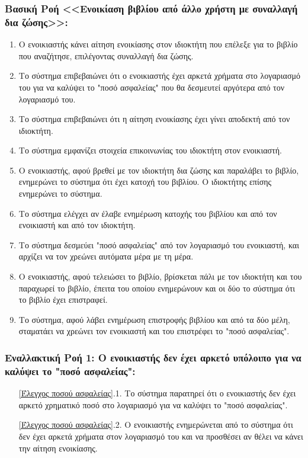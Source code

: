\documentclass[12pt,a4paper]{article}
\begin{document}
\subsubsection*{Βασική Ροή <<Ενοικίαση βιβλίου από άλλο χρήστη με συναλλαγή δια ζώσης>>:}
\begin{enumerate}
    \item Ο ενοικιαστής κάνει αίτηση ενοικίασης στον ιδιοκτήτη που επέλεξε για το βιβλίο που αναζήτησε, επιλέγοντας συναλλαγή δια ζώσης.
        \label{Επιλογή τρόπου συναλλαγής}
    \item Το σύστημα επιβεβαιώνει ότι ο ενοικιαστής έχει αρκετά χρήματα στο λογαριασμό του για να καλύψει το "ποσό ασφαλείας" που θα δεσμευτεί αργότερα από τον λογαριασμό του.
        \label{Έλεγχος ποσού ασφαλείας}
    \item Το σύστημα επιβεβαιώνει ότι η αίτηση ενοικίασης έχει γίνει αποδεκτή από τον ιδιοκτήτη.
        \label{Αποδοχή ή απόρριψη συναλλαγής}
    \item Το σύστημα εμφανίζει στοιχεία επικοινωνίας του ιδιοκτήτη στον ενοικιαστή.
    \item Ο ενοικιαστής, αφού βρεθεί με τον ιδιοκτήτη δια ζώσης και παραλάβει το βιβλίο, ενημερώνει το σύστημα ότι έχει κατοχή του βιβλίου. Ο ιδιοκτήτης επίσης ενημερώνει το σύστημα.
    \item Το σύστημα ελέγχει αν έλαβε ενημέρωση κατοχής του βιβλίου και από τον ενοικιαστή και από τον ιδιοκτήτη.
        \label {Δεν ενημερώνεται η κατοχή}
    \item Το σύστημα δεσμεύει "ποσό ασφαλείας" από τον λογαριασμό του ενοικιαστή, και αρχίζει να τον χρεώνει αυτόματα μέρα με τη μέρα.
        \label{Τέλος dispute resolved - Τέλος χρημάτων}
    \item Ο ενοικιαστής, αφού τελειώσει το βιβλίο, βρίσκεται πάλι με τον ιδιοκτήτη και του παραχωρεί το βιβλίο, έπειτα του οποίου ενημερώνουν και οι δύο το σύστημα ότι το βιβλίο έχει επιστραφεί.
        \label{Επιστροφή βιβλίου - Τέλος λεφτά δεν φτάνουν}
    \item Το σύστημα, αφού λάβει ενημέρωση επιστροφής βιβλίου και από τα δύο μέλη, σταματάει να χρεώνει τον ενοικιαστή και του επιστρέφει το "ποσό ασφαλείας".
        \label{Τέλος ενοικίασης}
\end{enumerate}

\subsubsection*{Εναλλακτική Ροή 1: Ο ενοικιαστής δεν έχει αρκετό υπόλοιπο για να καλύψει το "ποσό ασφαλείας":}
\begin{enumerate}
    \item[\ref{Έλεγχος ποσού ασφαλείας}.1.] Το σύστημα παρατηρεί ότι ο ενοικιαστής δεν έχει αρκετό χρηματικό ποσό στο λογαριασμό για να καλύψει το "ποσό ασφαλείας".
    \item[\ref{Έλεγχος ποσού ασφαλείας}.2.] Ο ενοικιαστής ενημερώνεται από το σύστημα ότι δεν έχει αρκετά χρήματα στον λογαριασμό του και να προσθέσει αν θέλει να κάνει την αίτηση ενοικίασης.
\end{enumerate}
\end{document}
